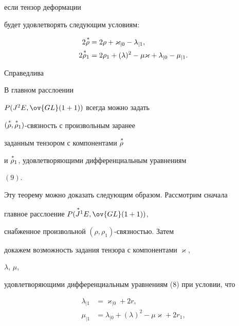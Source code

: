 если тензор деформации 


будет удовлетворять следующим условиям: 


\begin{equation} 


\begin{split} 


2\up{\,*}{\rho}&=2\rho+\varkappa_{|0}-\lambda_{|1},\\ 


2\up{\,*}{\rho}_1&=2\rho_1+(\lambda)^2-\mu\varkappa 


+\lambda_{|0}-\mu_{|1}. 


\end{split} 


\end{equation} 


Справедлива 


 


\begin{thm}[основная] В главном расслоении 


$P(J^2 E,\ov{GL}(1+1))$ всегда можно задать 


$(\overset{\,*}{\rho}{},\overset{\,*}{\rho}{}_1)$-связность с произвольным заранее 


заданным тензором с компонентами $\overset{\,*}{\rho}{}$ 


и $\overset{\,*}{\rho}{}_1$, удовлетворяющими дифференциальным уравнениям 


$(9)$. 


\end{thm} 


 


Эту теорему можно доказать следующим образом. Рассмотрим сначала 


главное расслоение $P(\up{\,*}{J}^1 E,\ov{GL}(1+1))$, 


снабженное произвольной $(\rho,\rho_1)$-связностью. Затем 


докажем возможность задания тензора с компонентами $\varkappa$, 


$\lambda$, $\mu$, 


удовлетворяющими дифференциальным уравнениям (8) при условии, что 


\begin{align*} 


\lambda_{|1}&=\varkappa_{|0}+2r,\\ 


\mu_{|1}&=\lambda_{|0}+(\lambda)^2-\mu\varkappa+2r_1, 


\end{align*} 


